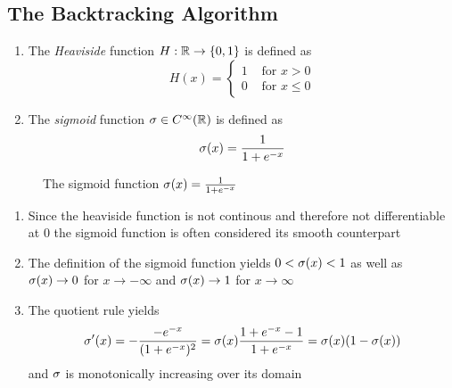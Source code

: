\subsection{The Backtracking Algorithm}

\begin{definition}\hfill
    \begin{enumerate}
		\item The \emph{Heaviside} function \( H: \mathbb{R} \to \{ 0, 1 \} \) is defined as
			\[
				H(x) = \left\{
					\begin{array}{ll}
						1 & \text{ for } x > 0 \\
						0 & \text{ for }x \le 0
					\end{array} 
				\right.
			\]
		\item The \emph{sigmoid} function \( \sigma \in C^\infty(\mathbb{R}) \) is defined as 
			\[
				\sigma(x) = \frac{1}{1 + e^{-x}}
			\]
    \end{enumerate}
\end{definition}
\bigskip


\begin{figure}[H]
	\centering
	\plotsigmoid
	\caption{The sigmoid function $ \sigma(x) = \frac{1}{1 + e^{-x}} $}\label{fig:sigmoid}
\end{figure}
\bigskip


\begin{remarks}\hfill
    \begin{enumerate}
		\item Since the heaviside function is not continous and therefore not differentiable at \( 0 \)
			the sigmoid function is often considered its smooth counterpart
		\item The definition of the sigmoid function yields \( 0 < \sigma(x) <  1 \) as well as 
			\( \sigma(x) \to 0 \) for \( x \to -\infty \) and \( \sigma(x) \to 1 \) for \( x \to \infty \)
		\item The quotient rule yields
			\[
				\sigma'(x) 
					= -\frac{-e^{-x}}{(1 + e^{-x})^2}
					= \sigma(x) \frac{1 + e^{-x} - 1}{1 + e^{-x}}
					= \sigma(x)(1 - \sigma(x))
			\]
			and \( \sigma \) is monotonically increasing over its domain
    \end{enumerate}
\end{remarks}
\bigskip


